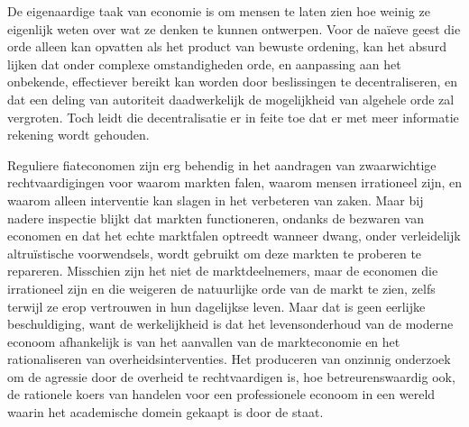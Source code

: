 \begin{blockquotebox}
De eigenaardige taak van economie is om mensen te laten zien hoe weinig ze eigenlijk weten over wat ze denken te kunnen ontwerpen. Voor de naïeve geest die orde alleen kan opvatten als het product van bewuste ordening, kan het absurd lijken dat onder complexe omstandigheden orde, en aanpassing aan het onbekende, effectiever bereikt kan worden door beslissingen te decentraliseren, en dat een deling van autoriteit daadwerkelijk de mogelijkheid van algehele orde zal vergroten. Toch leidt die decentralisatie er in feite toe dat er met meer informatie rekening wordt gehouden.\footnotemark
\end{blockquotebox}
\autocite{194}

Reguliere fiateconomen zijn erg behendig in het aandragen van zwaarwichtige rechtvaardigingen voor waarom markten falen, waarom mensen irrationeel zijn, en waarom alleen interventie kan slagen in het verbeteren van zaken. Maar bij nadere inspectie blijkt dat markten functioneren, ondanks de bezwaren van economen en dat het echte marktfalen optreedt wanneer dwang, onder verleidelijk altruïstische voorwendsels, wordt gebruikt om deze markten te proberen te repareren. Misschien zijn het niet de marktdeelnemers, maar de economen die irrationeel zijn en die weigeren de natuurlijke orde van de markt te zien, zelfs terwijl ze erop vertrouwen in hun dagelijkse leven. Maar dat is geen eerlijke beschuldiging, want de werkelijkheid is dat het levensonderhoud van de moderne econoom afhankelijk is van het aanvallen van de markteconomie en het rationaliseren van overheidsinterventies. Het produceren van onzinnig onderzoek om de agressie door de overheid te rechtvaardigen is, hoe betreurenswaardig ook, de rationele koers van handelen voor een professionele econoom in een wereld waarin het academische domein gekaapt is door de staat.
